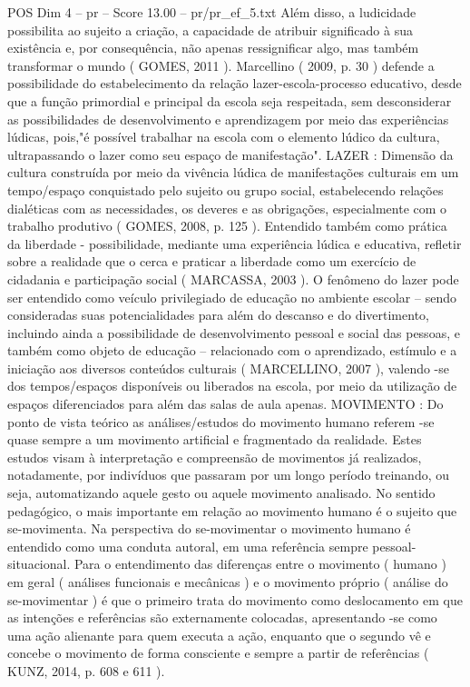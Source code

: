 \begin{textsample}{POS Dim 4 – pr – Score 13.00 – pr/pr\_ef\_5.txt}
Além disso, a ludicidade possibilita ao sujeito a criação, a capacidade de atribuir significado à sua existência e, por consequência, não apenas ressignificar algo, mas também transformar o mundo ( GOMES, 2011 ).
Marcellino ( 2009, p. 30 ) defende a possibilidade do estabelecimento da relação lazer-escola-processo educativo, desde que a função primordial e principal da escola seja respeitada, sem desconsiderar as possibilidades de desenvolvimento e aprendizagem por meio das experiências lúdicas, pois,"é possível trabalhar na escola com o elemento lúdico da cultura, ultrapassando o lazer como seu espaço de manifestação".
LAZER : Dimensão da cultura construída por meio da vivência lúdica de manifestações culturais em um tempo/espaço conquistado pelo sujeito ou grupo social, estabelecendo relações dialéticas com as necessidades, os deveres e as obrigações, especialmente com o trabalho produtivo ( GOMES, 2008, p. 125 ).
Entendido também como prática da liberdade - possibilidade, mediante uma experiência lúdica e educativa, refletir sobre a realidade que o cerca e praticar a liberdade como um exercício de cidadania e participação social ( MARCASSA, 2003 ).
O fenômeno do lazer pode ser entendido como veículo privilegiado de educação no ambiente escolar – sendo consideradas suas potencialidades para além do descanso e do divertimento, incluindo ainda a possibilidade de desenvolvimento pessoal e social das pessoas, e também como objeto de educação – relacionado com o aprendizado, estímulo e a iniciação aos diversos conteúdos culturais ( MARCELLINO, 2007 ), valendo -se dos tempos/espaços disponíveis ou liberados na escola, por meio da utilização de espaços diferenciados para além das salas de aula apenas.
MOVIMENTO : Do ponto de vista teórico as análises/estudos do movimento humano referem -se quase sempre a um movimento artificial e fragmentado da realidade.
Estes estudos visam à interpretação e compreensão de movimentos já realizados, notadamente, por indivíduos que passaram por um longo período treinando, ou seja, automatizando aquele gesto ou aquele movimento analisado.
No sentido pedagógico, o mais importante em relação ao movimento humano é o sujeito que se-movimenta.
Na perspectiva do se-movimentar o movimento humano é entendido como uma conduta autoral, em uma referência sempre pessoal-situacional.
Para o entendimento das diferenças entre o movimento ( humano ) em geral ( análises funcionais e mecânicas ) e o movimento próprio ( análise do se-movimentar ) é que o primeiro trata do movimento como deslocamento em que as intenções e referências são externamente colocadas, apresentando -se como uma ação alienante para quem executa a ação, enquanto que o segundo vê e concebe o movimento de forma consciente e sempre a partir de referências ( KUNZ, 2014, p. 608 e 611 ).

\end{textsample}
